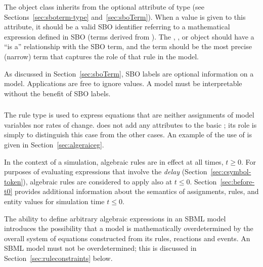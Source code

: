 The \Rule object class inherits from \SBase the optional  attribute of type
 (see Sections~\ref{sec:sboterm-type}
and~\ref{sec:sboTerm}).  When a value is given to this attribute, it
should be a valid SBO identifier referring to a mathematical
expression defined in SBO (\ie terms derived from
\sbomathformula).  The \AlgebraicRule, \AssignmentRule, or
\RateRule object should have a ``is a'' relationship with the SBO
term, and the term should be the most precise (narrow) term that
captures the role of that rule in the model.

As discussed in Section~\ref{sec:sboTerm}, SBO labels are optional
information on a model.  Applications are free to ignore
 values.  A model must be interpretable without the
benefit of SBO labels.


\subsubsection{}
\label{sec:algebraicrule}

The rule type \AlgebraicRule is used to express equations that are
neither assignments of model variables nor rates of change.
\AlgebraicRule does not add any attributes to the basic \Rule; its
role is simply to distinguish this case from the other cases.  An
example of the use of \AlgebraicRule is given in
Section~\ref{sec:algeraiceg}.

In the context of a simulation, algebraic rules are in effect at
all times, $t \geq 0$.  For purposes of evaluating expressions
that involve the \emph{delay} 
(Section~\ref{sec:csymbol-token}), algebraic rules are considered
to apply also at $t \leq 0$.  Section~\ref{sec:before-t0} provides
additional information about the semantics of assignments, rules,
and entity values for simulation time $t \leq 0$.



The ability to define arbitrary algebraic expressions in an SBML
model introduces the possibility that a model is mathematically
overdetermined by the overall system of equations constructed from
its rules, reactions and events.  An SBML model must not be
overdetermined; this is discussed in
Section~\ref{sec:ruleconstraints} below.




\subsubsection{}
\label{sec:assignmentrule}

